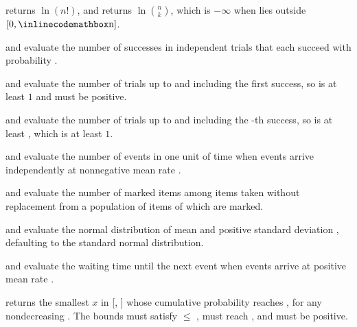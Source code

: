 \begin{compactitem}
  \item {} returns $\ln(n!)$, and  returns $\ln \binom{n}{k}$, which is $-\infty$ when  lies outside $[0, {\inlinecodemath{n}}]$.
  \item {} and  evaluate the number of successes in  independent trials that each succeed with probability .
  \item {} and  evaluate the number of trials up to and including the first success, so  is at least $1$ and  must be positive.
  \item {} and  evaluate the number of trials up to and including the -th success, so  is at least , which is at least $1$.
  \item {} and  evaluate the number of events in one unit of time when events arrive independently at nonnegative mean rate .
  \item {} and  evaluate the number of marked items among  items taken without replacement from a population of  items of which  are marked.
  \item {} and  evaluate the normal distribution of mean  and positive standard deviation , defaulting to the standard normal distribution.
  \item {} and  evaluate the waiting time until the next event when events arrive at positive mean rate .
  \item {} returns the smallest $x$ in [, ] whose cumulative probability  reaches , for any nondecreasing . The bounds must satisfy  $\leq$ ,  must reach , and  must be positive.
\end{compactitem}

